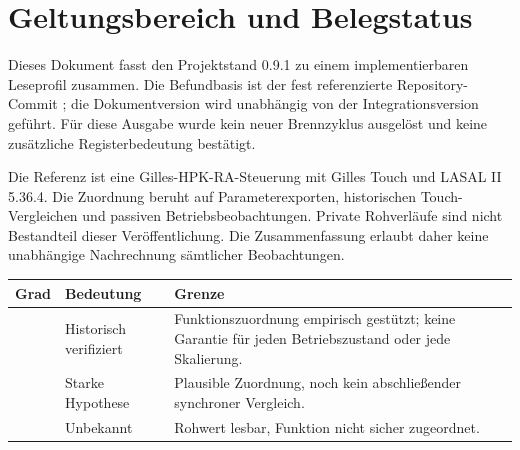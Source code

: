 \documentclass[10pt,a4paper]{article}
\begin{document}

\tableofcontents
\vspace{5mm}

\clearpage
\section{Geltungsbereich und Belegstatus}
Dieses Dokument fasst den Projektstand 0.9.1 zu einem implementierbaren Leseprofil zusammen. Die Befundbasis ist der fest referenzierte Repository-Commit ; die Dokumentversion wird unabhängig von der Integrationsversion geführt. Für diese Ausgabe wurde kein neuer Brennzyklus ausgelöst und keine zusätzliche Registerbedeutung bestätigt.

Die Referenz ist eine Gilles-HPK-RA-Steuerung mit Gilles Touch und LASAL II 5.36.4. Die Zuordnung beruht auf Parameterexporten, historischen Touch-Vergleichen und passiven Betriebsbeobachtungen. Private Rohverläufe sind nicht Bestandteil dieser Veröffentlichung. Die Zusammenfassung erlaubt daher keine unabhängige Nachrechnung sämtlicher Beobachtungen.

\par\noindent\begin{tabularx}{\linewidth}{@{}L{12mm}L{36mm}X@{}}
\toprule
\textbf{Grad} & \textbf{Bedeutung} & \textbf{Grenze}\\\midrule
{} & Historisch verifiziert & Funktionszuordnung empirisch gestützt; keine Garantie für jeden Betriebszustand oder jede Skalierung.\\
 & Starke Hypothese & Plausible Zuordnung, noch kein abschließender synchroner Vergleich.\\
 & Unbekannt & Rohwert lesbar, Funktion nicht sicher zugeordnet.\\\bottomrule
\end{tabularx}\par
\end{document}

